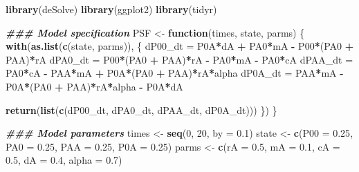 \documentclass[
]{book}
\newenvironment{Shaded}{\begin{snugshade}}{\end{snugshade}}
\newcommand{\AttributeTok}[1]{\textcolor[rgb]{0.13,0.29,0.53}{#1}}
\newcommand{\ControlFlowTok}[1]{\textcolor[rgb]{0.13,0.29,0.53}{\textbf{#1}}}
\newcommand{\DecValTok}[1]{\textcolor[rgb]{0.00,0.00,0.81}{#1}}
\newcommand{\DocumentationTok}[1]{\textcolor[rgb]{0.56,0.35,0.01}{\textbf{\textit{#1}}}}
\newcommand{\FloatTok}[1]{\textcolor[rgb]{0.00,0.00,0.81}{#1}}
\newcommand{\FunctionTok}[1]{\textcolor[rgb]{0.13,0.29,0.53}{\textbf{#1}}}
\newcommand{\NormalTok}[1]{#1}
\newcommand{\OtherTok}[1]{\textcolor[rgb]{0.56,0.35,0.01}{#1}}
\newcommand{\SpecialCharTok}[1]{\textcolor[rgb]{0.81,0.36,0.00}{\textbf{#1}}}
\begin{document}
\begin{Shaded}
\begin{Highlighting}[]
\FunctionTok{library}\NormalTok{(deSolve)}
\FunctionTok{library}\NormalTok{(ggplot2)}
\FunctionTok{library}\NormalTok{(tidyr)}


\DocumentationTok{\#\#\# Model specification}
\NormalTok{PSF }\OtherTok{\textless{}{-}} \ControlFlowTok{function}\NormalTok{(times, state, parms) \{}
  \FunctionTok{with}\NormalTok{(}\FunctionTok{as.list}\NormalTok{(}\FunctionTok{c}\NormalTok{(state, parms)), \{}
\NormalTok{    dP00\_dt }\OtherTok{=}\NormalTok{ P0A}\SpecialCharTok{*}\NormalTok{dA }\SpecialCharTok{+}\NormalTok{ PA0}\SpecialCharTok{*}\NormalTok{mA }\SpecialCharTok{{-}}\NormalTok{ P00}\SpecialCharTok{*}\NormalTok{(PA0 }\SpecialCharTok{+}\NormalTok{ PAA)}\SpecialCharTok{*}\NormalTok{rA}
\NormalTok{    dPA0\_dt }\OtherTok{=}\NormalTok{ P00}\SpecialCharTok{*}\NormalTok{(PA0 }\SpecialCharTok{+}\NormalTok{ PAA)}\SpecialCharTok{*}\NormalTok{rA }\SpecialCharTok{{-}}\NormalTok{ PA0}\SpecialCharTok{*}\NormalTok{mA }\SpecialCharTok{{-}}\NormalTok{ PA0}\SpecialCharTok{*}\NormalTok{cA}
\NormalTok{    dPAA\_dt }\OtherTok{=}\NormalTok{ PA0}\SpecialCharTok{*}\NormalTok{cA }\SpecialCharTok{{-}}\NormalTok{ PAA}\SpecialCharTok{*}\NormalTok{mA }\SpecialCharTok{+}\NormalTok{ P0A}\SpecialCharTok{*}\NormalTok{(PA0 }\SpecialCharTok{+}\NormalTok{ PAA)}\SpecialCharTok{*}\NormalTok{rA}\SpecialCharTok{*}\NormalTok{alpha}
\NormalTok{    dP0A\_dt }\OtherTok{=}\NormalTok{ PAA}\SpecialCharTok{*}\NormalTok{mA }\SpecialCharTok{{-}}\NormalTok{ P0A}\SpecialCharTok{*}\NormalTok{(PA0 }\SpecialCharTok{+}\NormalTok{ PAA)}\SpecialCharTok{*}\NormalTok{rA}\SpecialCharTok{*}\NormalTok{alpha }\SpecialCharTok{{-}}\NormalTok{ P0A}\SpecialCharTok{*}\NormalTok{dA}

    \FunctionTok{return}\NormalTok{(}\FunctionTok{list}\NormalTok{(}\FunctionTok{c}\NormalTok{(dP00\_dt, dPA0\_dt, dPAA\_dt, dP0A\_dt)))}
\NormalTok{  \})}
\NormalTok{\}}

\DocumentationTok{\#\#\# Model parameters}
\NormalTok{times }\OtherTok{\textless{}{-}} \FunctionTok{seq}\NormalTok{(}\DecValTok{0}\NormalTok{, }\DecValTok{20}\NormalTok{, }\AttributeTok{by =} \FloatTok{0.1}\NormalTok{)}
\NormalTok{state }\OtherTok{\textless{}{-}} \FunctionTok{c}\NormalTok{(}\AttributeTok{P00 =} \FloatTok{0.25}\NormalTok{, }\AttributeTok{PA0 =} \FloatTok{0.25}\NormalTok{, }\AttributeTok{PAA =} \FloatTok{0.25}\NormalTok{, }\AttributeTok{P0A =} \FloatTok{0.25}\NormalTok{)}
\NormalTok{parms }\OtherTok{\textless{}{-}} \FunctionTok{c}\NormalTok{(}\AttributeTok{rA =} \FloatTok{0.5}\NormalTok{, }\AttributeTok{mA =} \FloatTok{0.1}\NormalTok{, }\AttributeTok{cA =} \FloatTok{0.5}\NormalTok{, }\AttributeTok{dA =} \FloatTok{0.4}\NormalTok{, }\AttributeTok{alpha =} \FloatTok{0.7}\NormalTok{)}


\end{Highlighting}
\end{Shaded}
\end{document}
